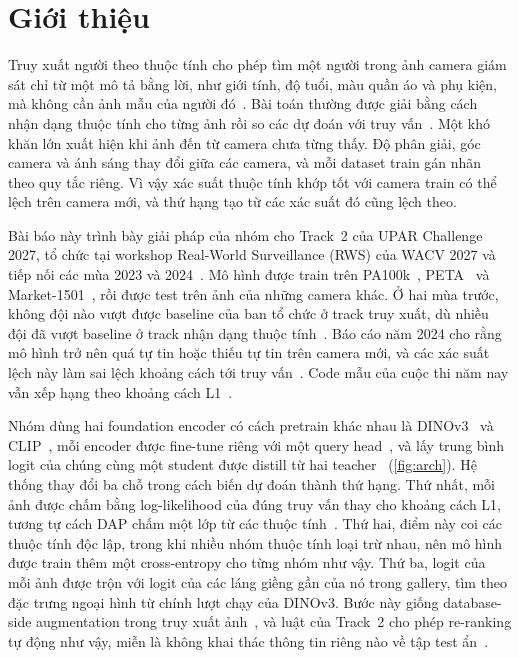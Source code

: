 \documentclass[10pt,twocolumn,letterpaper]{article}
\begin{document}
\section{Giới thiệu}
\label{sec:intro}

Truy xuất người theo thuộc tính cho phép tìm một người trong ảnh camera giám sát chỉ từ một mô tả bằng lời, như giới tính, độ tuổi, màu quần áo và phụ kiện, mà không cần ảnh mẫu của người đó~\cite{upar}. Bài toán thường được giải bằng cách nhận dạng thuộc tính cho từng ảnh rồi so các dự đoán với truy vấn~\cite{upar,specker21}. Một khó khăn lớn xuất hiện khi ảnh đến từ camera chưa từng thấy. Độ phân giải, góc camera và ánh sáng thay đổi giữa các camera, và mỗi dataset train gán nhãn theo quy tắc riêng. Vì vậy xác suất thuộc tính khớp tốt với camera train có thể lệch trên camera mới, và thứ hạng tạo từ các xác suất đó cũng lệch theo.

Bài báo này trình bày giải pháp của nhóm cho Track~2 của UPAR Challenge 2027, tổ chức tại workshop Real-World Surveillance (RWS) của WACV 2027 và tiếp nối các mùa 2023 và 2024~\cite{upar23,upar24}. Mô hình được train trên PA100k~\cite{pa100k}, PETA~\cite{peta} và Market-1501~\cite{market,marketattr}, rồi được test trên ảnh của những camera khác. Ở hai mùa trước, không đội nào vượt được baseline của ban tổ chức ở track truy xuất, dù nhiều đội đã vượt baseline ở track nhận dạng thuộc tính~\cite{upar23,upar24}. Báo cáo năm 2024 cho rằng mô hình trở nên quá tự tin hoặc thiếu tự tin trên camera mới, và các xác suất lệch này làm sai lệch khoảng cách tới truy vấn~\cite{upar24}. Code mẫu của cuộc thi năm nay vẫn xếp hạng theo khoảng cách L1~\cite{starterkit}.

Nhóm dùng hai foundation encoder có cách pretrain khác nhau là DINOv3~\cite{dinov3} và CLIP~\cite{clip}, mỗi encoder được fine-tune riêng với một query head~\cite{q2l}, và lấy trung bình logit của chúng cùng một student được distill từ hai teacher~\cite{hinton,patient} (\cref{fig:arch}). Hệ thống thay đổi ba chỗ trong cách biến dự đoán thành thứ hạng. Thứ nhất, mỗi ảnh được chấm bằng log-likelihood của đúng truy vấn thay cho khoảng cách L1, tương tự cách DAP chấm một lớp từ các thuộc tính~\cite{dap}. Thứ hai, điểm này coi các thuộc tính độc lập, trong khi nhiều nhóm thuộc tính loại trừ nhau, nên mô hình được train thêm một cross-entropy cho từng nhóm như vậy. Thứ ba, logit của mỗi ảnh được trộn với logit của các láng giềng gần của nó trong gallery, tìm theo đặc trưng ngoại hình từ chính lượt chạy của DINOv3. Bước này giống database-side augmentation trong truy xuất ảnh~\cite{turcot,gordo}, và luật của Track~2 cho phép re-ranking tự động như vậy, miễn là không khai thác thông tin riêng nào về tập test ẩn~\cite{rules}.
\end{document}
